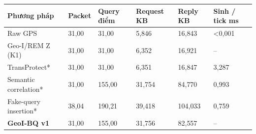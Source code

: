 \par\smallskip\noindent\begin{tabularx}{\linewidth}{@{}P{3.6cm}XXXXX@{}}\toprule
\textbf{Phương pháp} & \textbf{Packet} & \textbf{Query điểm} & \textbf{Request KB} & \textbf{Reply KB} & \textbf{Sinh / tick ms} \\
\midrule
Raw GPS & 31{,}00 & 31{,}00 & 5{,}846 & 16{,}843 & <0{,}001 \\
Geo-I/REM Z (K1) & 31{,}00 & 31{,}00 & 6{,}352 & 16{,}921 & -- \\
TransProtect* & 31{,}00 & 31{,}00 & 6{,}351 & 16{,}847 & 3{,}287 \\
Semantic correlation* & 31{,}00 & 155{,}00 & 31{,}754 & 84{,}770 & 0{,}993 \\
Fake-query insertion* & 38{,}04 & 190{,}21 & 39{,}418 & 104{,}033 & 0{,}759 \\
\textbf{GeoI-BQ v1} & 31{,}00 & 155{,}00 & 31{,}756 & 82{,}557 & -- \\
\bottomrule\end{tabularx}\par\smallskip
